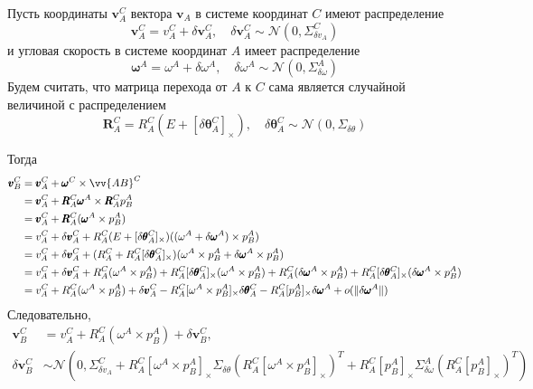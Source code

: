 \documentclass[12pt]{article}
\begin{document}
Пусть координаты $\pmb{v}_A^C$ вектора $\pmb{v}_A$ в системе координат $C$ имеют
распределение
$$
    \pmb{v}_A^C=v_A^C+\delta \pmb{v}_A^C,
    \quad
    \delta \pmb{v}_A^C \sim \mathcal{N}(0, \Sigma_{\delta v_A}^C)
$$
и угловая скорость в системе координат $A$ имеет распределение
$$
    \pmb{\omega}^A=\omega^A+\delta \omega^A,
    \quad
    \delta\omega^A\sim \mathcal{N}(0, \Sigma_{\delta \omega}^A)
$$
Будем считать, что матрица перехода от $A$ к $C$ сама является случайной
величиной с распределением
$$
    \pmb{R}_A^C=R_A^C(E+[\delta \pmb{\theta}_A^C]_\times),
    \quad
    \delta\pmb{\theta}_A^C \sim \mathcal{N}(0, \Sigma_{\delta \theta})
$$

Тогда
$$
    \begin{aligned}
        \pmb{v}_B^C
         & =\pmb{v}_A^C+\pmb{\omega}^C \times \vv{AB}^C                                \\
         & =\pmb{v}_A^C+\pmb{R}_A^C \pmb{\omega}^A \times \pmb{R}_A^C p_B^A            \\
         & =\pmb{v}_A^C+\pmb{R}_A^C (\pmb{\omega}^A \times p_B^A)                      \\
         & =v_A^C + \delta \pmb{v}_A^C + R_A^C (E+[\delta \pmb{\theta}_A^C]_\times)
        ((\omega^A + \delta \pmb{\omega}^A) \times p_B^A)                              \\
         & =v_A^C + \delta \pmb{v}_A^C + (R_A^C+R_A^C[\delta \pmb{\theta}_A^C]_\times)
        (\omega^A \times p_B^A + \delta \pmb{\omega}^A \times p_B^A)                   \\
         & =v_A^C + \delta \pmb{v}_A^C
        + R_A^C (\omega^A \times p_B^A)
        + R_A^C[\delta \pmb{\theta}_A^C]_\times (\omega^A \times p_B^A)
        + R_A^C (\delta \pmb{\omega}^A \times p_B^A)
        + R_A^C[\delta \pmb{\theta}_A^C]_\times (\delta \pmb{\omega}^A \times p_B^A)   \\
         & =v_A^C + R_A^C (\omega^A \times p_B^A)
        + \delta \pmb{v}_A^C
        - R_A^C[\omega^A \times p_B^A]_\times \delta \pmb{\theta}_A^C
        - R_A^C [p_B^A]_\times \delta \pmb{\omega}^A
        + o(\Vert \delta\pmb{\omega}^A\Vert)
    \end{aligned}
$$
Следовательно,
\begin{equation}
    \begin{aligned}
        \pmb{v}_B^C        & =v_A^C + R_A^C (\omega^A \times p_B^A) + \delta \pmb{v}_B^C, \\
        \delta \pmb{v}_B^C & \sim\mathcal{N}(
        0,
        \Sigma_{\delta v_A}^C
        +  R_A^C[\omega^A \times p_B^A]_\times \Sigma_{\delta \theta} (R_A^C[\omega^A \times p_B^A]_\times)^T
        + R_A^C[p_B^A]_\times \Sigma_{\delta\omega}^A (R_A^C[ p_B^A]_\times)^T
        )
    \end{aligned}
\end{equation}
\end{document}
